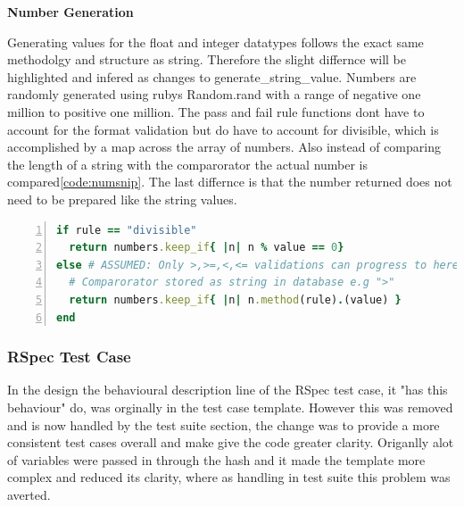 \documentclass[a4paper,12pt]{article}
\begin{document}
\par \textbf{Number Generation}
\par Generating values for the float and integer datatypes follows the exact same methodolgy and structure as string. Therefore the slight differnce will be highlighted and infered as changes to generate\_string\_value. Numbers are randomly generated using rubys Random.rand with a range of negative one million to positive one million. The pass and fail rule functions dont have to account for the format validation but do have to account for divisible, which is accomplished by a map across the array of numbers. Also instead of comparing the length of a string with the comparorator the actual number is compared\ref{code:numsnip}. The last differnce is that the number returned does not need to be prepared like the string values.

\begin{lstlisting}[frame=single,numbers=left,language = ruby,caption= {Differnce in pass/fail num rule to string pass/fail}, label={code:numsnip}]
if rule == "divisible"
  return numbers.keep_if{ |n| n % value == 0}
else # ASSUMED: Only >,>=,<,<= validations can progress to here
  # Comparorator stored as string in database e.g ">"
  return numbers.keep_if{ |n| n.method(rule).(value) }
end
\end{lstlisting}
\subsubsection{RSpec Test Case}

\par  In the design the behavioural description line of the RSpec test case, it "has this behaviour" do, was orginally in the test case template. However this was removed and is now handled by the test suite section, the change was to provide a more consistent test cases overall and make give the code greater clarity. Origanlly alot of variables were passed in through the hash and it made the template more complex and reduced its clarity, where as handling in test suite this problem was averted.
\end{document}
